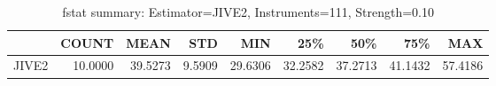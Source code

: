 \begin{table}[ht]
\centering
\caption{fstat summary: Estimator=JIVE2, Instruments=111, Strength=0.10}
\begin{tabular}{lrrrrrrrr}
\toprule
 & COUNT & MEAN & STD & MIN & 25\% & 50\% & 75\% & MAX \\
\midrule
JIVE2 & 10.0000 & 39.5273 & 9.5909 & 29.6306 & 32.2582 & 37.2713 & 41.1432 & 57.4186 \\
\bottomrule
\end{tabular}
\end{table}
